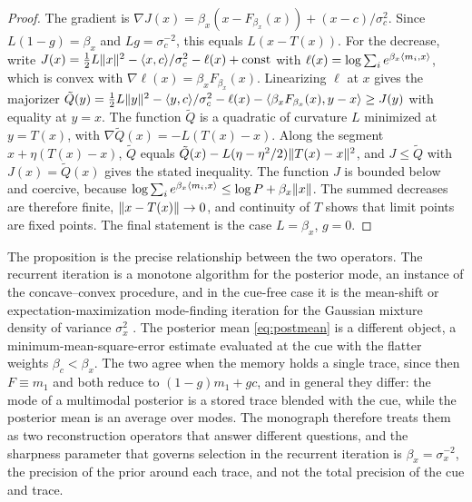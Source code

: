 \begin{proof}
The gradient is $\nabla J(x)=\beta_x(x-F_{\beta_x}(x))+(x-c)/\sigma_c^2$. Since $L(1-g)=\beta_x$ and $Lg=\sigma_c^{-2}$, this equals $L(x-T(x))$. For the decrease, write $J(x)=\tfrac12L\lVert x\rVert^2-\langle x,c\rangle/\sigma_c^2-\ell(x)+\mathrm{const}$ with $\ell(x)=\log\sum_ie^{\beta_x\langle m_i,x\rangle}$, which is convex with $\nabla\ell(x)=\beta_xF_{\beta_x}(x)$. Linearizing $\ell$ at $x$ gives the majorizer $\tilde Q(y)=\tfrac12L\lVert y\rVert^2-\langle y,c\rangle/\sigma_c^2-\ell(x)-\langle \beta_xF_{\beta_x}(x),y-x\rangle\ge J(y)$ with equality at $y=x$. The function $\tilde Q$ is a quadratic of curvature $L$ minimized at $y=T(x)$, with $\nabla\tilde Q(x)=-L(T(x)-x)$. Along the segment $x+\eta(T(x)-x)$, $\tilde Q$ equals $\tilde Q(x)-L(\eta-\eta^2/2)\lVert T(x)-x\rVert^2$, and $J\le\tilde Q$ with $J(x)=\tilde Q(x)$ gives the stated inequality. The function $J$ is bounded below and coercive, because $\log\sum_ie^{\beta_x\langle m_i,x\rangle}\le\log P+\beta_x\lVert x\rVert$. The summed decreases are therefore finite, $\lVert x-T(x)\rVert\to0$, and continuity of $T$ shows that limit points are fixed points. The final statement is the case $L=\beta_x$, $g=0$.
\end{proof}

The proposition is the precise relationship between the two operators. The recurrent iteration is a monotone algorithm for the posterior mode, an instance of the concave--convex procedure, and in the cue-free case it is the mean-shift or expectation-maximization mode-finding iteration for the Gaussian mixture density of variance $\sigma_x^2$ \cite{carreira2000}. The posterior mean \eqref{eq:postmean} is a different object, a minimum-mean-square-error estimate evaluated at the cue with the flatter weights $\beta_c<\beta_x$. The two agree when the memory holds a single trace, since then $F\equiv m_1$ and both reduce to $(1-g)m_1+gc$, and in general they differ: the mode of a multimodal posterior is a stored trace blended with the cue, while the posterior mean is an average over modes. The monograph therefore treats them as two reconstruction operators that answer different questions, and the sharpness parameter that governs selection in the recurrent iteration is $\beta_x=\sigma_x^{-2}$, the precision of the prior around each trace, and not the total precision of the cue and trace.

